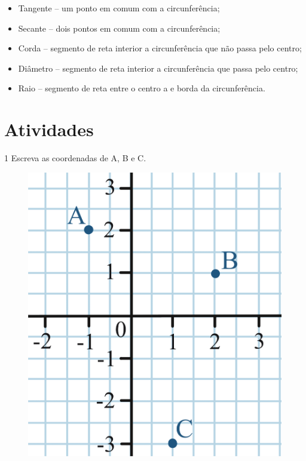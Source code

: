 {\begin{itemize}
\item
  Tangente -- um ponto em comum com a circunferência;
\item
  Secante -- dois pontos em comum com a circunferência;
\item
  Corda -- segmento de reta interior a circunferência que não passa pelo
  centro;
\item
  Diâmetro -- segmento de reta interior a circunferência que passa pelo
  centro;
\item
  Raio -- segmento de reta entre o centro a e borda da circunferência.
\end{itemize}
} 

\section*{Atividades}

\num{1} Escreva as coordenadas de A, B e C.

\begin{figure}[htpb!]
\centering
\includegraphics[width=\textwidth]{./ilustras-mat/modulo_10-atividade_1.png}
\end{figure}

